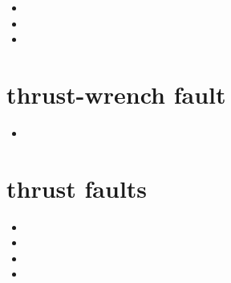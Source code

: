 \begin{small}
\begin{itemize}
\item[2019] 
\item[2020]  
\item[2022] 
\end{itemize}
\end{small}

\section{thrust-wrench fault} 

\begin{small}
\begin{itemize}
\item[\twothousandfifteen] 
\end{itemize}
\end{small}

\section{thrust faults} 

\begin{small}
\begin{itemize}
\item[\nineteenninety] 
\item[\nineteenninetytwo] 
\item[\twothousandfourteen] 
\item[2015]
\end{itemize}
\end{small}





